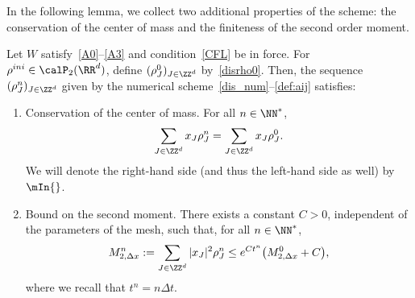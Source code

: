 In the following lemma, we collect two additional properties of the scheme: the conservation of the center of mass and the finiteness of the second order moment.

\goodbreak
\begin{lemm}\label{bounddismom}
Let $W$ satisfy~\eqref{A0}--\eqref{A3} and condition~\eqref{CFL} be in force. For $\rho^{ini}\in \calP_2(\RR^d)$, define $(\rho_{J}^0)_{J\in \ZZ^d}$ by~\eqref{disrho0}. Then, the sequence $(\rho_{J}^n)_{J\in \ZZ^d}$ given by the numerical scheme~\eqref{dis_num}--\eqref{def:aij} satisfies:
\begin{enumerate}\romanenumi
\item \label{3.2.1} Conservation of the center of mass. For all $n\in \NN^*$,
\[
\sum_{J\in \ZZ^d} x_J \rho_{J}^n = \sum_{J\in \ZZ^d} x_J \rho_{J}^0.
\]
We will denote the right-hand side (and thus the left-hand side as well) by $\mIn{}$.

\item \label{3.2.2} Bound on the second moment. There exists a constant $C>0$, independent of the parameters of the mesh, such that, for all $n\in \NN^*$,
\begin{equation*}
M_{2,\Delta x}^n := \sum_{J\in \ZZ^d} |x_J|^2\rho_{J}^n \leq e^{C t^n} \big(M_{2,\Delta x}^0 + C\big),
\end{equation*}
where we recall that $t^n=n\Delta t$.
\end{enumerate}
\end{lemm}


